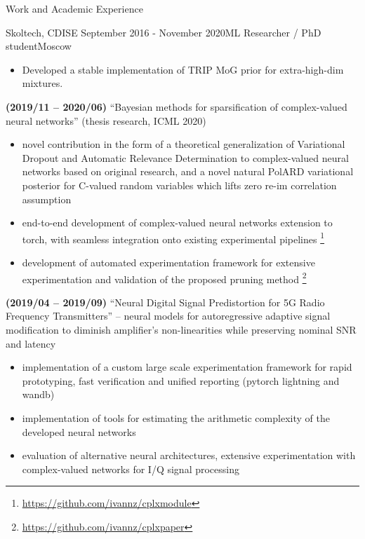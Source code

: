 \documentclass{resume} %
\begin{document}
\begin{rSection}{Work and Academic Experience}
\begin{rSubsection}{
        Skoltech, CDISE
    }{September 2016 - November 2020}{ML Researcher / PhD student}{Moscow}
\begin{itemize}
        \item Developed a stable implementation of TRIP MoG prior for extra-high-dim mixtures.
    \end{itemize}

    \item \textbf{(2019/11 -- 2020/06)}
    ``Bayesian methods for sparsification of complex-valued neural networks'' (thesis research, ICML 2020)
    \begin{itemize}
        \item novel contribution in the form of a theoretical generalization of Variational Dropout and Automatic Relevance Determination to complex-valued neural networks based on original research, and a novel natural PolARD variational posterior for C-valued random variables which lifts zero re-im correlation assumption

        \item end-to-end development of complex-valued neural networks extension to torch, with seamless integration onto existing experimental pipelines%
        \footnote{
            \url{https://github.com/ivannz/cplxmodule}
        }

        \item development of automated experimentation framework for extensive experimentation and validation of the proposed pruning method%
        \footnote{
            \url{https://github.com/ivannz/cplxpaper}
        }
    \end{itemize}

    \item \textbf{(2019/04 -- 2019/09)}
    ``Neural Digital Signal Predistortion for 5G Radio Frequency Transmitters'' -- neural models for autoregressive adaptive signal modification to diminish amplifier's non-linearities while preserving nominal SNR and latency
    \begin{itemize}
        \item implementation of a custom large scale experimentation framework for rapid prototyping, fast verification and unified reporting (pytorch lightning and wandb)

        \item implementation of tools for estimating the arithmetic complexity of the developed neural networks

        \item evaluation of alternative neural architectures, extensive experimentation with complex-valued networks for I/Q signal processing
    \end{itemize}


\end{rSubsection}
\end{rSection}
\end{document}
